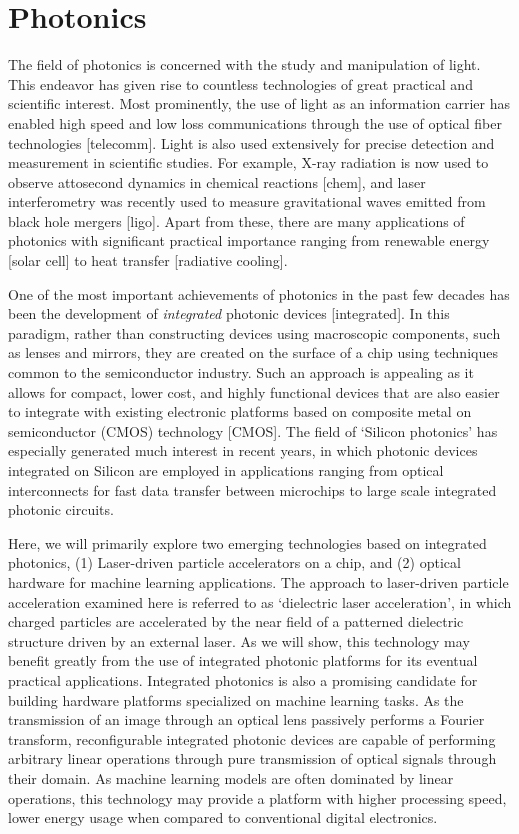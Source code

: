 \section{Photonics}


The field of photonics is concerned with the study and manipulation of light.
This endeavor has given rise to countless technologies of great practical and scientific interest.
Most prominently, the use of light as an information carrier has enabled high speed and low loss communications through the use of optical fiber technologies [telecomm].
Light is also used extensively for precise detection and measurement in  scientific studies.  
For example, X-ray radiation is now used to observe attosecond dynamics in chemical reactions [chem], and laser interferometry was recently used to measure gravitational waves emitted from black hole mergers [ligo].
Apart from these, there are many applications of photonics with significant practical importance ranging from renewable energy [solar cell] to heat transfer [radiative cooling].

One of the most important achievements of photonics in the past few decades has been the development of \textit{integrated} photonic devices [integrated].
In this paradigm, rather than constructing devices using macroscopic components, such as lenses and mirrors, they are created on the surface of a chip using techniques common to the semiconductor industry.
Such an approach is appealing as it allows for compact, lower cost, and highly functional devices that are also easier to integrate with existing electronic platforms based on composite metal on semiconductor (CMOS) technology [CMOS].
The field of `Silicon photonics' has especially generated much interest in recent years, in which photonic devices integrated on Silicon are employed in applications ranging from optical interconnects for fast data transfer between microchips to large scale integrated photonic circuits.

Here, we will primarily explore two emerging technologies based on integrated photonics, (1) Laser-driven particle accelerators on a chip, and (2) optical hardware for machine learning applications.
The approach to laser-driven particle acceleration examined here is referred to as `dielectric laser acceleration', in which charged particles are accelerated by the near field of a patterned dielectric structure driven by an external laser.
As we will show, this technology may benefit greatly from the use of integrated photonic platforms for its eventual practical applications.
Integrated photonics is also a promising candidate for building hardware platforms specialized on machine learning tasks.
As the transmission of an image through an optical lens passively performs a Fourier transform, reconfigurable integrated photonic devices are capable of performing arbitrary linear operations through pure transmission of optical signals through their domain.
As machine learning models are often dominated by linear operations, this technology may provide a platform with higher processing speed, lower energy usage when compared to conventional digital electronics.

